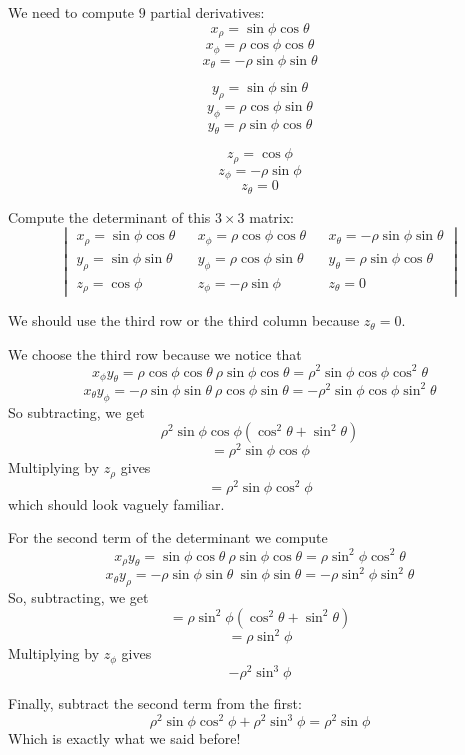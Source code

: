 \documentclass[11pt, oneside]{article}
\begin{document}
We need to compute $9$ partial derivatives:
\[ x_{\rho} = \sin \phi \cos \theta \]
\[ x_{\phi}  = \rho \cos \phi \cos \theta \]
\[ x_{\theta} = -\rho \sin \phi \sin \theta \]

\[ y_{\rho} = \sin \phi \sin \theta \]
\[ y_{\phi}  = \rho \cos \phi \sin \theta \]
\[ y_{\theta} = \rho \sin \phi \cos \theta \]

\[ z_{\rho} = \cos \phi \]
\[ z_{\phi}  = -\rho \sin \phi \]
\[ z_{\theta} = 0 \]

Compute the determinant of this $3 \times 3$ matrix:
\[ \begin{vmatrix}
x_{\rho} = \sin \phi \cos \theta && x_{\phi}  = \rho \cos \phi \cos \theta &&x_{\theta} = -\rho \sin \phi \sin \theta  \\
y_{\rho} = \sin \phi \sin \theta && y_{\phi}  = \rho \cos \phi \sin \theta && y_{\theta} = \rho \sin \phi \cos \theta  \\
z_{\rho} = \cos \phi &&  z_{\phi}  = -\rho \sin \phi && z_{\theta} = 0
\end{vmatrix} \]

We should use the third row or the third column because $z_{\theta} = 0$.  

We choose the third row because we notice that
\[ x_{\phi} y_{\theta} = \rho \cos \phi \cos \theta \ \rho \sin \phi \cos \theta = \rho^2 \sin \phi \cos \phi \cos^2 \theta \]
\[ x_{\theta} y_{\phi} = -\rho \sin \phi \sin \theta \ \rho \cos \phi \sin \theta = -\rho^2 \sin \phi \cos \phi \sin^2 \theta \]
So subtracting, we get 
\[ \rho^2 \sin \phi \cos \phi (\cos^2 \theta + \sin^2 \theta) \]
\[ = \rho^2 \sin \phi \cos \phi \]
Multiplying by $z_\rho$ gives
\[ = \rho^2 \sin \phi \cos^2 \phi \]
which should look vaguely familiar.

For the second term of the determinant we compute
\[ x_{\rho} y_{\theta} = \sin \phi \cos \theta \ \rho \sin \phi \cos \theta  = \rho \sin^2 \phi \cos^2 \theta \]
\[ x_{\theta} y_{\rho} = -\rho \sin \phi \sin \theta \ \sin \phi \sin \theta = -\rho \sin^2 \phi \sin^2 \theta \]
So, subtracting, we get
\[ = \rho \sin^2 \phi (\cos^2 \theta + \sin^2 \theta) \]
\[ = \rho \sin^2 \phi \]
Multiplying by $z_\phi$ gives
\[ - \rho^2 \sin^3 \phi \]

Finally, subtract the second term from the first:
\[ \rho^2 \sin \phi \cos^2 \phi + \rho^2 \sin^3 \phi  = \rho^2 \sin \phi \]
Which is exactly what we said before!
\end{document}
